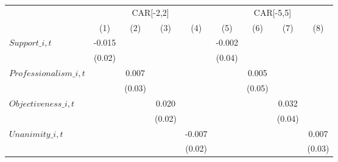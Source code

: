 {
\def\sym#1{\ifmmode^{#1}\else\(^{#1}\)\fi}
\begin{tabular}{l*{8}{c}}
\toprule
                    &\multicolumn{4}{c}{CAR[-2,2]}                                                          &\multicolumn{4}{c}{CAR[-5,5]}                                                          \\\cmidrule(lr){2-5}\cmidrule(lr){6-9}
                    &\multicolumn{1}{c}{(1)}         &\multicolumn{1}{c}{(2)}         &\multicolumn{1}{c}{(3)}         &\multicolumn{1}{c}{(4)}         &\multicolumn{1}{c}{(5)}         &\multicolumn{1}{c}{(6)}         &\multicolumn{1}{c}{(7)}         &\multicolumn{1}{c}{(8)}         \\
\midrule
$\textit{Support}\_{i,t}$&      -0.015         &                     &                     &                     &      -0.002         &                     &                     &                     \\
                    &      (0.02)         &                     &                     &                     &      (0.04)         &                     &                     &                     \\
$\textit{Professionalism}\_{i,t}$&                     &       0.007         &                     &                     &                     &       0.005         &                     &                     \\
                    &                     &      (0.03)         &                     &                     &                     &      (0.05)         &                     &                     \\
$\textit{Objectiveness}\_{i,t}$&                     &                     &       0.020         &                     &                     &                     &       0.032         &                     \\
                    &                     &                     &      (0.02)         &                     &                     &                     &      (0.04)         &                     \\
$\textit{Unanimity}\_{i,t}$&                     &                     &                     &      -0.007         &                     &                     &                     &       0.007         \\
                    &                     &                     &                     &      (0.02)         &                     &                     &                     &      (0.03)         \\

\end{tabular}}

